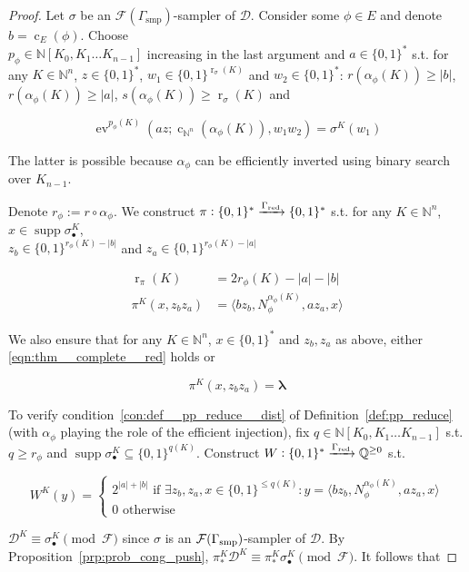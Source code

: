 \documentclass{article}
\numberwithin{equation}{section}
\theoremstyle{definition}
\theoremstyle{plain}
\newcommand{\Bool}{\{0,1\}}
\newcommand{\Words}{{\Bool^*}}
\DeclareMathOperator{\Supp}{supp}
\DeclareMathOperator{\Ev}{ev}
\DeclareMathOperator{\R}{r}
\DeclareMathOperator{\En}{c}
\newcommand{\Nats}{\mathbb{N}}
\newcommand{\Rats}{\mathbb{Q}}
\newcommand{\NatPoly}{\Nats[K_0, K_1 \ldots K_{n-1}]}
\newcommand{\Estr}{\bm{\lambda}}
\newcommand{\Abs}[1]{\lvert #1 \rvert}
\newcommand{\Chev}[1]{\langle #1 \rangle}
\newcommand{\Dist}{\mathcal{D}}
\newcommand{\Fall}{\mathcal{F}}
\begin{document}
\begin{proof}

Let ${\sigma}$ be an ${\Fall(\Gamma_{\text{smp}})}$-sampler of ${\Dist}$. Consider some ${\phi \in E}$ and denote ${b=\En_E(\phi)}$. Choose\\ ${p_\phi \in \NatPoly}$ increasing in the last argument and ${a \in \Words}$ s.t. for any ${K \in \Nats^{n}}$, ${z \in \Words}$, ${w_1 \in \Bool^{\R_\sigma(K)}}$ and ${w_2 \in \Words}$: ${r(\alpha_\phi(K)) \geq \Abs{b}}$, ${r(\alpha_\phi(K)) \geq \Abs{a}}$, ${s(\alpha_\phi(K)) \geq \R_\sigma(K)}$ and 

\[\Ev^{p_\phi(K)}(az;\En_{\Nats^n}(\alpha_\phi(K)),w_1 w_2)=\sigma^{K}(w_1)\]

The latter is possible because ${\alpha_\phi}$ can be efficiently inverted using binary search over ${K_{n-1}}$.

Denote ${r_\phi := r \circ \alpha_\phi}$. We construct ${\pi: \Words \xrightarrow{\Gamma_{\textnormal{red}}} \Words}$ s.t. for any ${K \in \Nats^{n}}$, ${x \in \Supp \sigma_{\bullet}^{K}}$,\\  ${z_b \in \Bool^{r_\phi(K)-\Abs{b}}}$ and ${z_a \in \Bool^{r_\phi(K)-\Abs{a}}}$

\begin{align}
\R_\pi(K) &= 2r_\phi(K)-\Abs{a}-\Abs{b} \\
\label{eqn:thm__complete__red}\pi^{K}(x,z_b z_a)&=\Chev{bz_b,N_\phi^{\alpha_\phi(K)},a z_a, x} 
\end{align}

We also ensure that for any ${K \in \Nats^n}$, ${x \in \Words}$ and ${z_b,z_a}$ as above, either \ref{eqn:thm__complete__red} holds or 

\[\pi^K(x,z_b z_a)=\Estr\]

To verify condition~\ref{con:def__pp_reduce__dist} of Definition~\ref{def:pp_reduce} (with ${\alpha_\phi}$ playing the role of the efficient injection), fix ${q \in \NatPoly}$ s.t. $q \geq r_\phi$ and $\Supp \sigma_\bullet^K \subseteq \Bool^{q(K)}$. Construct ${W: \Words \xrightarrow{\Gamma_{\textnormal{red}}} \Rats^{\geq 0}}$ s.t. 

\[W^K(y)=\begin{cases}2^{\Abs{a}+\Abs{b}} \text{ if } \exists z_b,z_a,x \in \Bool^{\leq q(K)}: y=\Chev{bz_b,N_\phi^{\alpha_\phi(K)}, az_a,x}\\0 \text{ otherwise}\end{cases}\]

${\Dist^K \equiv \sigma_\bullet^K \pmod{\Fall}}$ since ${\sigma}$ is an ${\Fall(\Gamma_{\textnormal{smp}})}$-sampler of ${\Dist}$. By Proposition~\ref{prp:prob_cong_push}, ${\pi_*^K\Dist^K \equiv \pi_*^K\sigma_\bullet^K \pmod{\Fall}}$. It follows that


\end{proof}
\end{document}

